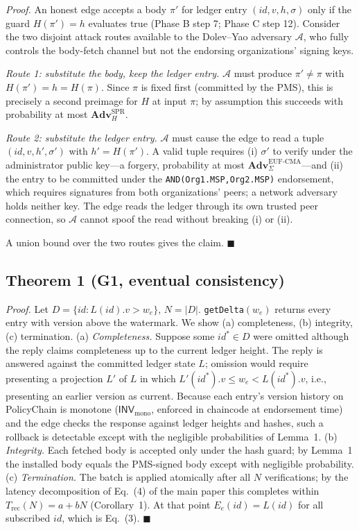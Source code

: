 \documentclass[runningheads]{llncs}
\begin{document}
\smallskip\noindent\emph{Proof.}
An honest edge accepts a body $\pi'$ for ledger entry $(\mathit{id},v,h,\sigma)$ only if the guard $H(\pi')=h$ evaluates true (Phase B step 7; Phase C step 12). Consider the two disjoint attack routes available to the Dolev--Yao adversary $\mathcal{A}$, who fully controls the body-fetch channel but not the endorsing organizations' signing keys.

\emph{Route 1: substitute the body, keep the ledger entry.} $\mathcal{A}$ must produce $\pi'\neq\pi$ with $H(\pi')=h=H(\pi)$. Since $\pi$ is fixed first (committed by the PMS), this is precisely a second preimage for $H$ at input $\pi$; by assumption this succeeds with probability at most $\mathbf{Adv}^{\mathrm{SPR}}_{H}$.

\emph{Route 2: substitute the ledger entry.} $\mathcal{A}$ must cause the edge to read a tuple $(\mathit{id},v,h',\sigma')$ with $h'=H(\pi')$. A valid tuple requires (i) $\sigma'$ to verify under the administrator public key---a forgery, probability at most $\mathbf{Adv}^{\mathrm{EUF\text{-}CMA}}_{\Sigma}$---and (ii) the entry to be committed under the \texttt{AND(Org1.MSP,Org2.MSP)} endorsement, which requires signatures from both organizations' peers; a network adversary holds neither key. The edge reads the ledger through its own trusted peer connection, so $\mathcal{A}$ cannot spoof the read without breaking (i) or (ii).

A union bound over the two routes gives the claim. \hfill$\blacksquare$

\subsection*{Theorem 1 (G1, eventual consistency)}
\emph{Proof.}
Let $D=\{\mathit{id}: L(\mathit{id}).v > w_e\}$, $N=|D|$. \texttt{getDelta}$(w_e)$ returns every entry with version above the watermark. We show (a) completeness, (b) integrity, (c) termination.
(a) \emph{Completeness.} Suppose some $\mathit{id}^\ast\in D$ were omitted although the reply claims completeness up to the current ledger height. The reply is answered against the committed ledger state $L$; omission would require presenting a projection $L'$ of $L$ in which $L'(\mathit{id}^\ast).v \le w_e < L(\mathit{id}^\ast).v$, i.e., presenting an earlier version as current. Because each entry's version history on PolicyChain is monotone ($\mathsf{INV}_{\mathrm{mono}}$, enforced in chaincode at endorsement time) and the edge checks the response against ledger heights and hashes, such a rollback is detectable except with the negligible probabilities of Lemma~1.
(b) \emph{Integrity.} Each fetched body is accepted only under the hash guard; by Lemma~1 the installed body equals the PMS-signed body except with negligible probability.
(c) \emph{Termination.} The batch is applied atomically after all $N$ verifications; by the latency decomposition of Eq.~(4) of the main paper this completes within $T_{\mathrm{rec}}(N)=a+bN$ (Corollary~1). At that point $E_e(\mathit{id})=L(\mathit{id})$ for all subscribed $\mathit{id}$, which is Eq.~(3). \hfill$\blacksquare$
\end{document}

